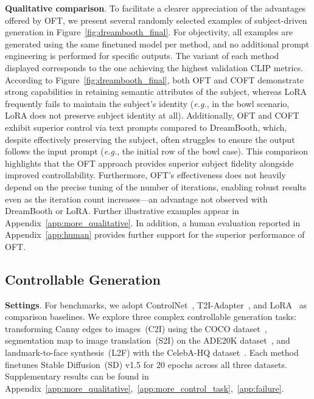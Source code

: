 \textbf{Qualitative comparison}. To facilitate a clearer appreciation of the advantages offered by OFT, we present several randomly selected examples of subject-driven generation in Figure~\ref{fig:dreambooth_final}. For objectivity, all examples are generated using the same finetuned model per method, and no additional prompt engineering is performed for specific outputs. The variant of each method displayed corresponds to the one achieving the highest validation CLIP metrics. According to Figure~\ref{fig:dreambooth_final}, both OFT and COFT demonstrate strong capabilities in retaining semantic attributes of the subject, whereas LoRA frequently fails to maintain the subject's identity (\emph{e.g.}, in the bowl scenario, LoRA does not preserve subject identity at all). Additionally, OFT and COFT exhibit superior control via text prompts compared to DreamBooth, which, despite effectively preserving the subject, often struggles to ensure the output follows the input prompt (\emph{e.g.}, the initial row of the bowl case). This comparison highlights that the OFT approach provides superior subject fidelity alongside improved controllability. Furthermore, OFT's effectiveness does not heavily depend on the precise tuning of the number of iterations, enabling robust results even as the iteration count increases—an advantage not observed with DreamBooth or LoRA. Further illustrative examples appear in Appendix~\ref{app:more_qualitative}. In addition, a human evaluation reported in Appendix~\ref{app:human} provides further support for the superior performance of OFT.

\subsection{Controllable Generation}

\textbf{Settings}. For benchmarks, we adopt ControlNet~\cite{zhang2023adding}, T2I-Adapter~\cite{mou2023t2i}, and LoRA~\cite{hulora2022} as comparison baselines. We explore three complex controllable generation tasks: transforming Canny edges to images~(C2I) using the COCO dataset~\cite{lin2014microsoft}, segmentation map to image translation~(S2I) on the ADE20K dataset~\cite{zhou2017scene}, and landmark-to-face synthesis~(L2F) with the CelebA-HQ dataset~\cite{karras2018progressive,xia2021tedigan}. Each method finetunes Stable Diffusion~(SD) v1.5 for 20 epochs across all three datasets. Supplementary results can be found in Appendix~\ref{app:more_qualitative},~\ref{app:more_control_task},~\ref{app:failure}.


